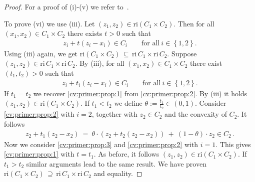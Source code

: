 \begin{proof}
  For a proof of (i)-(v) we refer to~\cite[Theorem 6.2 - 6.7]{Rockafellar1970}.

To prove (vi) we use (iii).
Let
  $
  (z_1, z_2)
  \in 
  \mathrm{ri}(C_1\!\times C_2).
  $
  Then for all 
  $
  (x_1, x_2)
  \in 
  C_1\!\times C_2
  $
  there exists
  $t>0$
  such that
  \begin{gather}
    \label{cv:primer:prop:1}
      z_i + t (z_i-x_i)
      \in C_i
      \qquad
      \text{for all}\ 
      i\in \left\{ 1,2 \right\}.
  \end{gather}
  Using (iii) again, we get
  $
  \mathrm{ri}(C_1\!\times C_2)
  \, 
  \subseteq
  \,
          \mathrm{ri}\,C_1
          \! 
          \times
          \mathrm{ri}\,C_2
  $.
  Suppose 
  $
  (z_1,z_2)
    \in
    \mathrm{ri}\,C_1
    \!
    \times
    \mathrm{ri}\,C_2
  $.
  By (iii), for all
  $
    (x_1,x_2)\in C_1\times C_2
  $
  there exist
  $
    (t_1,t_2)>0
  $
  such that
  \begin{gather}
    \label{cv:primer:prop:2}
      z_i + t_i (z_i-x_i)
      \in C_i
      \qquad
      \text{for all}\ 
      i\in \left\{ 1,2 \right\}.
  \end{gather}
  If $t_1=t_2$
  we recover
  \eqref{cv:primer:prop:1}
  from
  \eqref{cv:primer:prop:2}.
  By (iii) it holds
  $
  (z_1,z_2)
    \in
    \mathrm{ri}
    (C_1
    \!
    \times
    C_2)
  $.
  If
  $t_1<t_2$
  we
  define $\theta:=\frac{t_1}{t_2}\in (0,1).$
  Consider  
  \eqref{cv:primer:prop:2} with $i=2$,
  together with $z_2 \in C_2$
  and
  the convexity of $C_2$.
  It follows
  \begin{gather}
    \label{cv:primer:prop:3}
    z_2 + t_1 (z_2 - x_2)
    \ 
    =
    \ 
    \theta
    \cdot
    (
    z_2 + t_2 (z_2 - x_2)
    )
    \ 
    +
    \ 
    (1-\theta)
    \cdot
    z_2
    \in C_2
    \,.
  \end{gather}
  Now we consider
  \eqref{cv:primer:prop:3} and
  \eqref{cv:primer:prop:2} with $i=1$.
  This gives \eqref{cv:primer:prop:1} with $t=t_1$.
  As before, it follows
  $
  (z_1,z_2)\in\mathrm{ri}(C_1\!\times C_2)
  $.
  If 
  $t_1>t_2$
  similar arguments lead to the same result.
  We have proven 
  $
  \mathrm{ri}(C_1\!\times C_2)
  \, 
  \supseteq
  \,
          \mathrm{ri}\,C_1
          \! 
          \times
          \mathrm{ri}\,C_2
  $
  and equality.
\end{proof}
